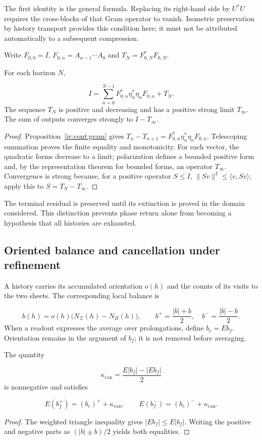 The first identity is the general formula. Replacing its right-hand side by \(U^*U\) requires the cross-blocks of that Gram operator to vanish. Isometric preservation by history transport provides this condition here; it must not be attributed automatically to a subsequent compression.

Write \(F_{0,0}=I\), \(F_{0,n}=A_{n-1}\cdots A_0\) and \(T_N=F_{0,N}^*F_{0,N}\).

\begin{theorem}
\label{iv:cont:terminal}
For each horizon \(N\),

\[
I=\sum_{n=0}^{N-1}
F_{0,n}^*\eta_n^*\eta_nF_{0,n}+T_N.
\]
The sequence \(T_N\) is positive and decreasing and has a positive strong limit \(T_\infty\). The sum of outputs converges strongly to \(I-T_\infty\).

\end{theorem}
\begin{proof}
Proposition~\ref{iv:cont:gram} gives \(T_n-T_{n+1}=F_{0,n}^*\eta_n^*\eta_nF_{0,n}\). Telescoping summation proves the finite equality and monotonicity. For each vector, the quadratic forms decrease to a limit; polarization defines a bounded positive form and, by the representation theorem for bounded forms, an operator \(T_\infty\). Convergence is strong because, for a positive operator \(S\leq I\), \(\|Sv\|^2\leq\langle v,Sv\rangle\); apply this to \(S=T_N-T_\infty\).
\end{proof}

The terminal residual is preserved until its extinction is proved in the domain considered. This distinction prevents phase return alone from becoming a hypothesis that all histories are exhausted.

\subsection{Oriented balance and cancellation under refinement}
\label{iv:cont:balance}
A history carries its accumulated orientation \(o(h)\) and the counts of its visits to the two sheets. The corresponding local balance is

\[
b(h)=o(h)\bigl(N_\Sigma(h)-N_\Pi(h)\bigr),
\qquad
b^+=\frac{|b|+b}{2},\quad b^-=\frac{|b|-b}{2}.
\]
When a readout expresses the average over prolongations, define \(b_c=Eb_f\). Orientation remains in the argument of \(b_f\); it is not removed before averaging.

\begin{proposition}
\label{iv:cont:cancelacion}
The quantity

\[
\kappa_{\mathrm{can}}=
\frac{E|b_f|-|Eb_f|}{2}
\]
is nonnegative and satisfies

\[
E(b_f^+)=(b_c)^++\kappa_{\mathrm{can}},
\qquad
E(b_f^-)=(b_c)^-+\kappa_{\mathrm{can}}.
\]
\end{proposition}
\begin{proof}
The weighted triangle inequality gives \(|Eb_f|\leq E|b_f|\). Writing the positive and negative parts as \((|b|\pm b)/2\) yields both equalities.
\end{proof}

